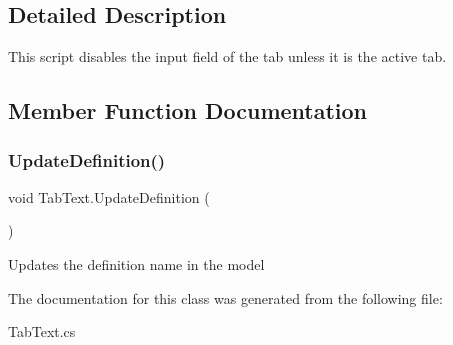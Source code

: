\subsection{Detailed Description}
This script disables the input field of the tab unless it is the active tab. 



\subsection{Member Function Documentation}
\mbox{\label{class_tab_text_a10061d722257289b90501c8251fa2d1a}} 
\subsubsection{\texorpdfstring{Update\+Definition()}{UpdateDefinition()}}
{\footnotesize\ttfamily void Tab\+Text.\+Update\+Definition (\begin{DoxyParamCaption}{ }\end{DoxyParamCaption})}



Updates the definition name in the model 



The documentation for this class was generated from the following file\+:\begin{DoxyCompactItemize}
\item 
Tab\+Text.\+cs\end{DoxyCompactItemize}
